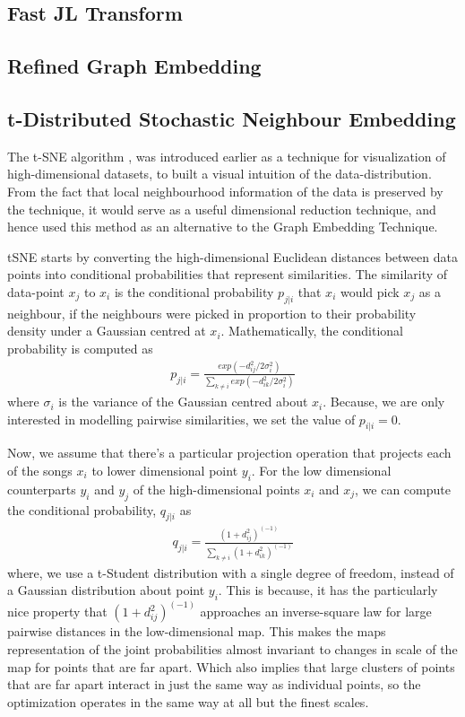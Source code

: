 \documentclass[12pt]{article}
\begin{document}
\subsection{Fast JL Transform}

\subsection{Refined Graph Embedding}

\subsection{t-Distributed Stochastic Neighbour Embedding}
The t-SNE algorithm \cite{tSNEdataViz}, was introduced earlier as a technique for visualization of high-dimensional datasets, to built a visual intuition of the data-distribution. From the fact that local neighbourhood information of the data is preserved by the technique, it would serve as a useful dimensional reduction technique, and hence used this method as an alternative to the Graph Embedding Technique.

tSNE starts by converting the high-dimensional Euclidean distances between data points  into conditional probabilities that represent similarities. The similarity of data-point $x_j$ to $x_i$ is the conditional probability $p_{j|i}$ that $x_i$ would pick $x_j$ as a neighbour, if the neighbours were picked in proportion to their probability density under a Gaussian centred at $x_i$. Mathematically, the conditional probability is computed as
\begin{align}
p_{j|i} = \frac{exp( - d_{ij}^2/ 2\sigma_i^2)}{\sum_{k \ne i} exp( - d_{ik}^2/ 2\sigma_i^2)}\label{eq:prob_nbr_HD}
\end{align} where $\sigma_i$ is the variance of the Gaussian centred about $x_i$. Because, we are only interested  in modelling pairwise similarities, we set the value of $p_{i|i} = 0$.

Now, we assume that there's a particular projection operation that projects each of the songs $x_i$ to lower dimensional point $y_i$. For the low dimensional counterparts $y_i$ and $y_j$ of the high-dimensional points $x_i$ and $x_j$, we can compute the conditional probability, $q_{j|i}$ as 
\begin{align}
q_{j|i} = \frac{(1 + d_{ij}^2)^(-1)}{\sum_{k \ne i} (1 + d_{ik}^2)^(-1)}
\end{align}
where, we use a t-Student distribution with a single degree of freedom, instead of a Gaussian distribution about point $y_i$. This is because, it has the particularly nice property that $(1 + d_{ij}^2)^(-1)$ approaches an inverse-square law for large pairwise distances in the low-dimensional map. This makes the maps representation of the joint probabilities almost invariant to changes in scale of the map for points that are far apart. Which also implies that large clusters of points that are far apart interact in just the same way as individual points, so the optimization operates in the same way at all but the finest scales. 
\end{document}
